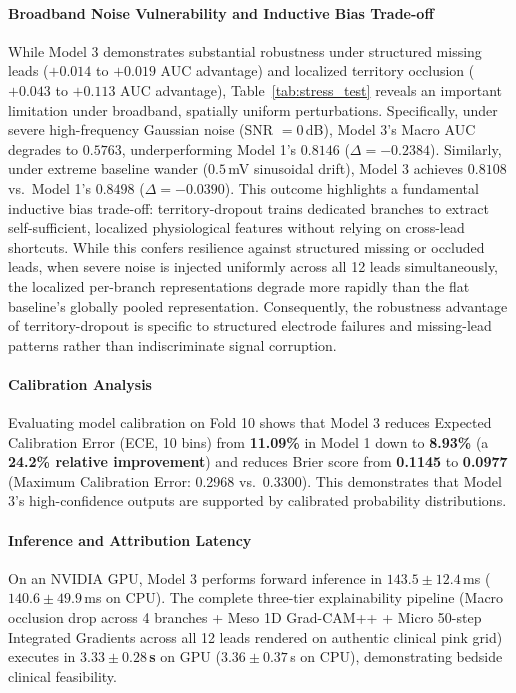 \documentclass[5p,twocolumn,10pt]{elsarticle}
\begin{document}
\paragraph{Broadband Noise Vulnerability and Inductive Bias Trade-off}
While Model 3 demonstrates substantial robustness under structured missing leads ($+0.014$ to $+0.019$ AUC advantage) and localized territory occlusion ($+0.043$ to $+0.113$ AUC advantage), Table~\ref{tab:stress_test} reveals an important limitation under broadband, spatially uniform perturbations. Specifically, under severe high-frequency Gaussian noise (SNR $= 0$\,dB), Model 3's Macro AUC degrades to $0.5763$, underperforming Model 1's $0.8146$ ($\Delta = -0.2384$). Similarly, under extreme baseline wander ($0.5$\,mV sinusoidal drift), Model 3 achieves $0.8108$ vs.\ Model 1's $0.8498$ ($\Delta = -0.0390$). This outcome highlights a fundamental inductive bias trade-off: territory-dropout trains dedicated branches to extract self-sufficient, localized physiological features without relying on cross-lead shortcuts. While this confers resilience against structured missing or occluded leads, when severe noise is injected uniformly across all 12 leads simultaneously, the localized per-branch representations degrade more rapidly than the flat baseline's globally pooled representation. Consequently, the robustness advantage of territory-dropout is specific to structured electrode failures and missing-lead patterns rather than indiscriminate signal corruption.

\paragraph{Calibration Analysis}
Evaluating model calibration on Fold 10 shows that Model 3 reduces Expected Calibration Error (ECE, 10 bins) from \textbf{11.09\%} in Model 1 down to \textbf{8.93\%} (a \textbf{24.2\% relative improvement}) and reduces Brier score from \textbf{0.1145} to \textbf{0.0977} (Maximum Calibration Error: 0.2968 vs.\ 0.3300). This demonstrates that Model 3's high-confidence outputs are supported by calibrated probability distributions.

\paragraph{Inference and Attribution Latency}
On an NVIDIA GPU, Model 3 performs forward inference in $143.5 \pm 12.4$\,ms ($140.6 \pm 49.9$\,ms on CPU). The complete three-tier explainability pipeline (Macro occlusion drop across 4 branches + Meso 1D Grad-CAM++ + Micro 50-step Integrated Gradients across all 12 leads rendered on authentic clinical pink grid) executes in \textbf{$3.33 \pm 0.28$\,s} on GPU ($3.36 \pm 0.37$\,s on CPU), demonstrating bedside clinical feasibility.
\end{document}
